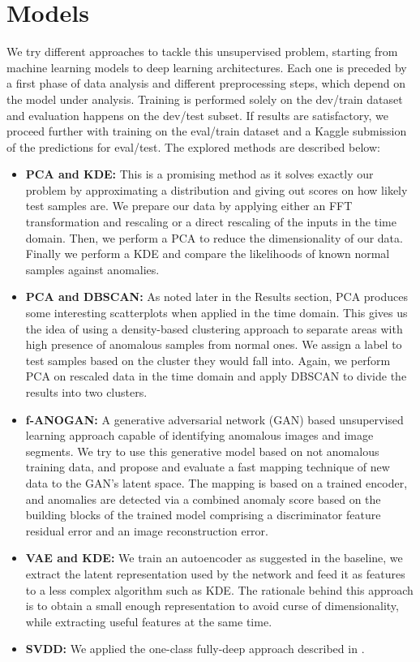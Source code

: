 \documentclass{article}
\begin{document}
\section{Models}
We try different approaches to tackle this unsupervised problem, starting from machine learning models to deep learning architectures. Each one is preceded by a first phase of data analysis and different preprocessing steps, which depend on the model under analysis. Training is performed solely on the dev/train dataset and evaluation happens on the dev/test subset. If results are satisfactory, we proceed further with training on the eval/train dataset and a Kaggle submission of the predictions for eval/test. The explored methods are described below:
\begin{itemize}
	\item \textbf{PCA and KDE:} This is a promising method as it solves exactly our problem by approximating a distribution and giving out scores on how likely test samples are. We prepare our data by applying either an FFT transformation and rescaling or a direct rescaling of the inputs in the time domain. Then, we perform a PCA to reduce the dimensionality of our data. Finally we perform a KDE and compare the likelihoods of known normal samples against anomalies.  
	\item \textbf{PCA and DBSCAN:} As noted later in the Results section, PCA produces some interesting scatterplots when applied in the time domain. This gives us the idea of using a density-based clustering approach to separate areas with high presence of anomalous samples from normal ones. We assign a label to test samples based on the cluster they would fall into. Again, we perform PCA on rescaled data in the time domain and apply DBSCAN to divide the results into two clusters.
	\item \textbf{f-ANOGAN:}\cite{fANOGAN} A generative adversarial network (GAN) based unsupervised learning approach capable of identifying anomalous images and image segments. We try to use this generative model based on not anomalous training data, and propose and evaluate a fast mapping technique of new data to the GAN's latent space. The mapping is based on a trained encoder, and anomalies are detected via a combined anomaly score based on the building blocks of the trained model comprising a discriminator feature residual error and an image reconstruction error. 
	\item \textbf{VAE and KDE:} We train an autoencoder as suggested in the baseline, we extract the latent representation used by the network and feed it as features to a less complex algorithm such as KDE. The rationale behind this approach is to obtain a small enough representation to avoid curse of dimensionality, while extracting useful features at the same time. 
	\item \textbf{SVDD:} We applied the one-class fully-deep approach described in \cite{ruff18a}.
	

\end{itemize}
\end{document}

